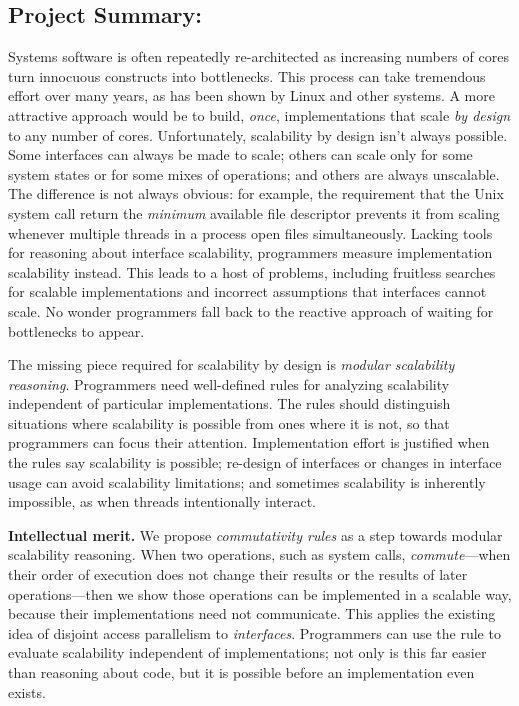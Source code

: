 \subsection*{Project Summary: \proptitle{}}
\label{sec:summary}

%
Systems software is often repeatedly
re-architected as increasing numbers of cores
turn innocuous constructs into bottlenecks.
%
This process can take tremendous effort over many years, as has been shown by
Linux and other systems.
%
A more attractive approach would be to build, \emph{once},
implementations that scale \emph{by design} to any number
of cores.
%
Unfortunately, scalability by design isn't always possible.
%
Some interfaces can always be made to scale;
%
others can scale only for some system states or for some
mixes of operations;
%
and others are always unscalable.
%
The difference is not always obvious: for example, the requirement
that the Unix  system call return the \emph{minimum}
available file descriptor prevents it from scaling whenever multiple
threads in a process open files simultaneously.
%
Lacking tools for reasoning about interface scalability,
programmers measure implementation scalability instead.
%
This leads to a host of problems, including fruitless searches for scalable
implementations and incorrect assumptions that interfaces cannot scale.
%
No wonder programmers fall back to the reactive approach of waiting for
bottlenecks to appear.

The missing piece required for scalability by design is \emph{modular
scalability reasoning}.
%
Programmers need well-defined rules for analyzing scalability
independent of particular implementations.
%
The rules should distinguish situations where scalability is possible
from ones where it is not, so that programmers can focus their
attention.
%
Implementation effort is justified when the rules say scalability is
possible; re-design of interfaces or changes in interface usage
can avoid scalability limitations; and sometimes scalability is
inherently impossible, as when threads intentionally interact.

\textbf{Intellectual merit.}
%
We propose
\emph{commutativity rules}
as a step towards modular scalability reasoning.
%
When two
operations, such as system calls, \emph{commute}---when their order of
execution does not change their results or the results of later
operations---then we show those operations can be implemented in a scalable way, because
their implementations need not communicate.
%
This applies the existing idea of disjoint access parallelism to
\emph{interfaces}.
%
Programmers can use the rule to evaluate scalability independent of
implementations; not only is this far easier than reasoning about code, but it
is possible before an implementation even exists.


